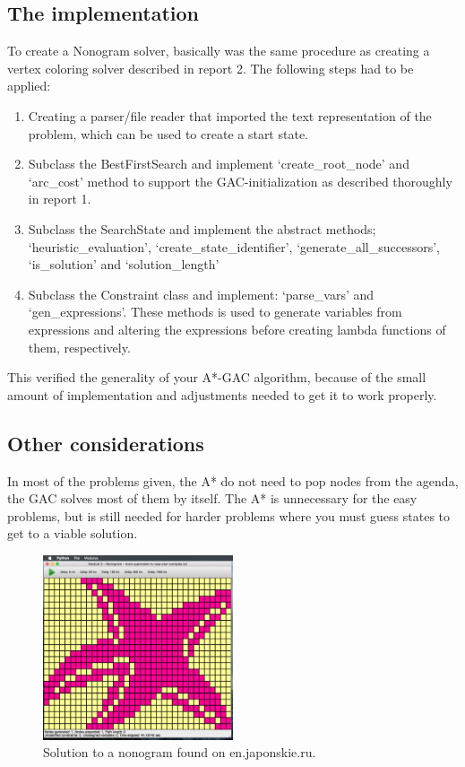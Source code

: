 \subsection{The implementation}
To create a Nonogram solver, basically was the same procedure as creating a vertex coloring solver described in report 2. The following steps had to be applied:
\begin{enumerate}
	\item{Creating a parser/file reader that imported the text representation of the problem, which can be used to create a start state.}
	\item{Subclass the BestFirstSearch and implement `create\_root\_node' and `arc\_cost' method to support the GAC-initialization as described thoroughly in report 1.}
	\item{Subclass the SearchState and implement the abstract methods; `heuristic\_evaluation', `create\_state\_identifier', `generate\_all\_successors', `is\_solution' and `solution\_length' }
	\item{Subclass the Constraint class and implement: `parse\_vars' and `gen\_expressions'. These methods is used to generate variables from expressions and altering the expressions before creating lambda functions of them, respectively.}
\end{enumerate}

This verified the generality of your A*-GAC algorithm, because of the small amount of implementation and adjustments needed to get it to work properly.

\subsection{Other considerations}
In most of the problems given, the A* do not need to pop nodes from the agenda, the GAC solves most of them by itself. The A* is unnecessary for the easy problems, but is still needed for harder problems where you must guess states to get to a viable solution.

\begin{figure}[h!]
  \centering
    \includegraphics[width=0.5\textwidth]{module_3/images/nonogram}
  \caption{Solution to a nonogram found on en.japonskie.ru.}
  \label{constraint:vertex}
\end{figure}
